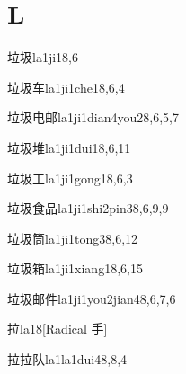 
\section*{L}

\begin{verbete}{垃圾}{la1ji1}{8,6}
\end{verbete}

\begin{verbete}{垃圾车}{la1ji1che1}{8,6,4}
\end{verbete}

\begin{verbete}{垃圾电邮}{la1ji1dian4you2}{8,6,5,7}
\end{verbete}

\begin{verbete}{垃圾堆}{la1ji1dui1}{8,6,11}
\end{verbete}

\begin{verbete}{垃圾工}{la1ji1gong1}{8,6,3}
\end{verbete}

\begin{verbete}{垃圾食品}{la1ji1shi2pin3}{8,6,9,9}
\end{verbete}

\begin{verbete}{垃圾筒}{la1ji1tong3}{8,6,12}
\end{verbete}

\begin{verbete}{垃圾箱}{la1ji1xiang1}{8,6,15}
\end{verbete}

\begin{verbete}{垃圾邮件}{la1ji1you2jian4}{8,6,7,6}
\end{verbete}

\begin{verbete}{拉}{la1}{8}[Radical 手]
\end{verbete}

\begin{verbete}{拉拉队}{la1la1dui4}{8,8,4}
\end{verbete}

